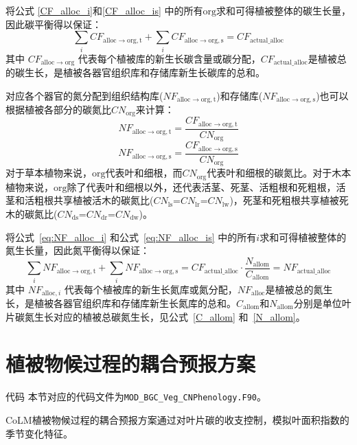 将公式 \eqref{CF_alloc_i}和\eqref{CF_alloc_is} 中的所有${\mathrm {org}}$求和可得植被整体的碳生长量，因此碳平衡得以保证：
\begin{equation}
  \sum_{i}{CF_{\mathrm{alloc\rightarrow org,t}}}+\sum_{i}{CF_{\mathrm{alloc\rightarrow org,s}}}=CF_{\mathrm{actual\_alloc}}
\end{equation}
其中 $CF_{\mathrm{alloc\rightarrow org}}$ 代表每个植被库的新生长碳含量或碳分配，$CF_{\mathrm{actual\_alloc}}$是植被总的碳生长，是植被各器官组织库和存储库新生长碳库的总和。


对应各个器官的氮分配到组织结构库($NF_{\mathrm{alloc\rightarrow org,t}}$)和存储库($NF_{\mathrm{alloc\rightarrow org,s}}$)也可以根据植被各部分的碳氮比$CN_{\mathrm {org}}$来计算：
\begin{equation}\label{eq:NF_alloc_i}
  NF_{\mathrm{alloc\rightarrow org,t}} = \frac{CF_{\mathrm{alloc\rightarrow org,t}}}{CN_{\mathrm{org}}}
\end{equation}
\begin{equation}\label{eq:NF_alloc_is}
  NF_{\mathrm{alloc\rightarrow org,s}} = \frac{CF_{\mathrm{alloc\rightarrow org,s}}}{CN_{\mathrm{org}}}
\end{equation}
对于草本植物来说，${\mathrm {org}}$代表叶和细根，而$CN_{\mathrm{org}}$代表叶和细根的碳氮比。对于木本植物来说，${\mathrm {org}}$除了代表叶和细根以外，还代表活茎、死茎、活粗根和死粗根，活茎和活粗根共享植被活木的碳氮比($CN_{\mathrm{ls}}$=$CN_{\mathrm{lr}}$=$CN_{\mathrm{lw}}$)，死茎和死粗根共享植被死木的碳氮比($CN_{\mathrm{ds}}$=$CN_{\mathrm{dr}}$=$CN_{\mathrm{dw}}$)。


将公式~\eqref{eq:NF_alloc_i} 和公式~\eqref{eq:NF_alloc_is} 中的所有${i}$求和可得植被整体的氮生长量，因此氮平衡得以保证：
\begin{equation}
  \sum_{i}{NF_{\mathrm{alloc\rightarrow org,t}}}+\sum_{i}{NF_{\mathrm{alloc\rightarrow org,s}}}=CF_{\mathrm{actual\_alloc}}\cdot \frac{N_{\mathrm{allom}}}{C_{\mathrm{allom}}}=NF_{\mathrm{actual\_alloc}}
\end{equation}
其中 $NF_{\mathrm{alloc},i}$ 代表每个植被库的新生长氮库或氮分配，$NF_{\mathrm{alloc}}$是植被总的氮生长，是植被各器官组织库和存储库新生长氮库的总和。$C_{\mathrm{allom}}$和$N_{\mathrm{allom}}$分别是单位叶片碳氮生长对应的植被总碳氮生长，见公式~\eqref{C_allom} 和~\eqref{N_allom}。


\section{植被物候过程的耦合预报方案}\label{植被物候过程的耦合预报方案}
\begin{mymdframed}{代码}
  本节对应的代码文件为\texttt{MOD\_BGC\_Veg\_CNPhenology.F90}。
\end{mymdframed}
CoLM植被物候过程的耦合预报方案通过对叶片碳的收支控制，模拟叶面积指数的季节变化特征。


